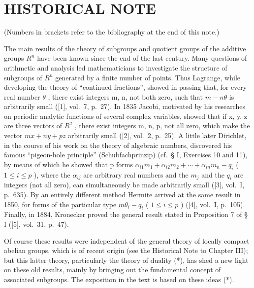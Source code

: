 \section*{HISTORICAL NOTE}
{}

(Numbers in brackets refer to the bibliography at the end of this note.)

The main results of the theory of subgroups and quotient groups of the additive groups \(R^{n}\) have been known since the end of the last century. Many questions of arithmetic and analysis led mathematicians to investigate the structure of subgroups of \(R^{n}\) generated by a finite number of points. Thus Lagrange, while developing the theory of ``continued fractions'', showed in passing that, for every real number \(\theta\) , there exist integers m, n, not both zero, such that \(m - n\theta\) is arbitrarily small ({[}1{]}, vol.~7, p.~27). In 1835 Jacobi, motivated by his researches on periodic analytic functions of several complex variables, showed that if x, y, z are three vectors of \(R^{2}\) , there exist integers m, n, p, not all zero, which make the vector \(mx + ny + pz\) arbitrarily small ({[}2{]}, vol.~2, p.~25). A little later Dirichlet, in the course of his work on the theory of algebraic numbers, discovered his famous ``pigeon-hole principle'' (Schubfachprinzip) (cf.~§ I, Exercises 10 and 11), by means of which he showed that p forms \(\alpha_{i1}m_{1} + \alpha_{i2}m_{2} + \cdots + \alpha_{in}m_{n} - q_{i}\) ( \(1 \leqslant i \leqslant p\) ), where the \(\alpha_{ij}\) are arbitrary real numbers and the \(m_{j}\) and the \(q_{i}\) are integers (not all zero), can simultaneously be made arbitrarily small ({[}3{]}, vol.~I, p.~635). By an entirely different method Hermite arrived at the same result in 1850, for forms of the particular type \(m\theta_{i} - q_{i}\) ( \(1 \leqslant i \leqslant p\) ) ({[}4{]}, vol.~I, p.~105). Finally, in 1884, Kronecker proved the general result stated in Proposition 7 of § I ({[}5{]}, vol.~31, p.~47).

Of course these results were independent of the general theory of locally compact abelian groups, which is of recent origin (see the Historical Note to Chapter III); but this latter theory, particularly the theory of duality (*), has shed a new light on these old results, mainly by bringing out the fundamental concept of associated subgroups. The exposition in the text is based on these ideas (*).


